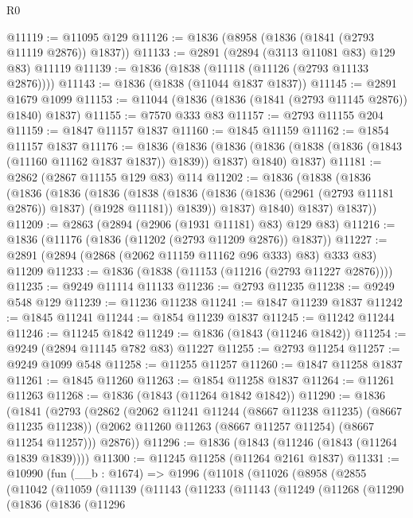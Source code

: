 \begin{lexlean}{R0}
\begin{coremodule}
@11119 := @11095 @129
@11126 := @1836 (@8958 (@1836 (@1841 (@2793 @11119 @2876)) @1837))
@11133 := @2891 (@2894 (@3113 @11081 @83) @129 @83) @11119
@11139 := @1836 (@1838 (@11118 (@11126 (@2793 @11133 @2876))))
@11143 := @1836 (@1838 (@11044 @1837 @1837))
@11145 := @2891 @1679 @1099
@11153 := @11044 (@1836 (@1836 (@1841 (@2793 @11145 @2876)) @1840) @1837)
@11155 := @7570 @333 @83
@11157 := @2793 @11155 @204
@11159 := @1847 @11157 @1837
@11160 := @1845 @11159
@11162 := @1854 @11157 @1837
@11176 := @1836
    (@1836
      (@1836 (@1836 (@1838 (@1836 (@1843 (@11160 @11162 @1837 @1837)) @1839)) @1837) @1840)
      @1837)
@11181 := @2862 (@2867 @11155 @129 @83) @114
@11202 := @1836
    (@1838
      (@1836
        (@1836
          (@1836
            (@1836
              (@1838
                (@1836 (@1836 (@1836 (@2961 (@2793 @11181 @2876)) @1837) (@1928 @11181)) @1839))
              @1837)
            @1840)
          @1837)
        @1837))
@11209 := @2863 (@2894 (@2906 (@1931 @11181) @83) @129 @83)
@11216 := @1836 (@11176 (@1836 (@11202 (@2793 @11209 @2876)) @1837))
@11227 := @2891 (@2894 (@2868 (@2062 @11159 @11162 @96 @333) @83) @333 @83) @11209
@11233 := @1836 (@1838 (@11153 (@11216 (@2793 @11227 @2876))))
@11235 := @9249 @11114 @11133
@11236 := @2793 @11235
@11238 := @9249 @548 @129
@11239 := @11236 @11238
@11241 := @1847 @11239 @1837
@11242 := @1845 @11241
@11244 := @1854 @11239 @1837
@11245 := @11242 @11244
@11246 := @11245 @1842
@11249 := @1836 (@1843 (@11246 @1842))
@11254 := @9249 (@2894 @11145 @782 @83) @11227
@11255 := @2793 @11254
@11257 := @9249 @1099 @548
@11258 := @11255 @11257
@11260 := @1847 @11258 @1837
@11261 := @1845 @11260
@11263 := @1854 @11258 @1837
@11264 := @11261 @11263
@11268 := @1836 (@1843 (@11264 @1842 @1842))
@11290 := @1836
    (@1841
      (@2793
        (@2862
          (@2062 @11241 @11244 (@8667 @11238 @11235) (@8667 @11235 @11238))
          (@2062 @11260 @11263 (@8667 @11257 @11254) (@8667 @11254 @11257)))
        @2876))
@11296 := @1836 (@1843 (@11246 (@1843 (@11264 @1839 @1839))))
@11300 := @11245 @11258 (@11264 @2161 @1837)
@11331 := @10990
    (fun (__b : @1674) =>
    @1996
      (@11018
        (@11026
          (@8958
            (@2855
              (@11042
                (@11059
                  (@11139
                    (@11143
                      (@11233
                        (@11143
                          (@11249
                            (@11268
                              (@11290
                                (@1836
                                  (@1836
                                    (@11296

\end{coremodule}
\end{lexlean}
